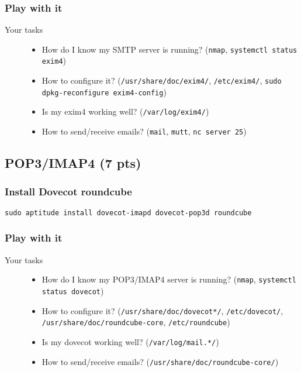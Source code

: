 \documentclass{article} [NO-DEFAULT-PACKAGES] \usepackage{wx672hyperref}
\begin{document}
\subsubsection{Play with it}
\label{sec:orge8e72df}
\begin{description}
\item[{Your tasks}] \begin{itemize}
\item How do I know my SMTP server is running? (\texttt{nmap}, \texttt{systemctl status exim4})
\item How to configure it? (\texttt{/usr/share/doc/exim4/}, \texttt{/etc/exim4/},
\texttt{sudo dpkg-reconfigure exim4-config})
\item Is my exim4 working well? (\texttt{/var/log/exim4/})
\item How to send/receive emails? (\texttt{mail}, \texttt{mutt}, \texttt{nc server 25})
\end{itemize}
\end{description}

\subsection{POP3/IMAP4 (7 pts)}
\label{sec:org2ad3c4c}
\subsubsection{Install Dovecot roundcube}
\label{sec:org275513f}
\begin{verbatim}
sudo aptitude install dovecot-imapd dovecot-pop3d roundcube
\end{verbatim}

\subsubsection{Play with it}
\label{sec:org979f267}
\begin{description}
\item[{Your tasks}] \begin{itemize}
\item How do I know my POP3/IMAP4 server is running? (\texttt{nmap}, \texttt{systemctl status dovecot})
\item How to configure it? (\texttt{/usr/share/doc/dovecot*/}, \texttt{/etc/dovecot/},
\texttt{/usr/share/doc/roundcube-core}, \texttt{/etc/roundcube})
\item Is my dovecot working well? (\texttt{/var/log/mail.*/})
\item How to send/receive emails? (\texttt{/usr/share/doc/roundcube-core/})
\end{itemize}
\end{description}
\end{document}
